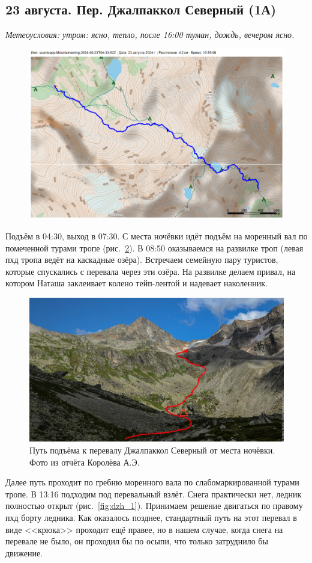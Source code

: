 \subsection{23 августа.  Пер. Джалпаккол Северный (1А)}
\textit{Метеоусловия: утром: ясно, тепло, после 16:00 туман, дождь, вечером ясно.}

\begin{figure}[h!]
	\centering
	\includegraphics[angle=0, width=0.7\linewidth]{../pics/mini_maps/23}
	\label{fig:mini_23}
\end{figure}


Подъём в 04:30, выход в 07:30. С места ночёвки идёт подъём на моренный вал по помеченной турами тропе (рис.~\ref{fig:23augstart}). В 08:50 оказываемся на развилке троп (левая пхд тропа ведёт на каскадные озёра). Встречаем семейную пару туристов, которые спускались с перевала через эти озёра. На развилке делаем привал, на котором Наташа заклеивает колено тейп-лентой и надевает наколенник.

\begin{figure}[h!]
	\centering
	\includegraphics[angle=0, width=0.7\linewidth]{../pics/23augstart}
	\caption{Путь подъёма к перевалу Джалпаккол Северный от места ночёвки. Фото из отчёта Королёва А.Э. \cite{Korolyov2018}}
	\label{fig:23augstart}
\end{figure}

 Далее путь проходит по гребню моренного вала по слабомаркированной турами тропе. В 13:16 подходим под перевальный взлёт. Снега практически нет, ледник полностью открыт (рис.~\ref{fig:dzh_1}). Принимаем решение двигаться по правому пхд борту ледника. Как оказалось позднее, стандартный путь на этот перевал в виде <<крюка>> проходит ещё правее, но в нашем случае, когда снега на перевале не было, он проходил бы по осыпи, что только затруднило бы движение.
 



